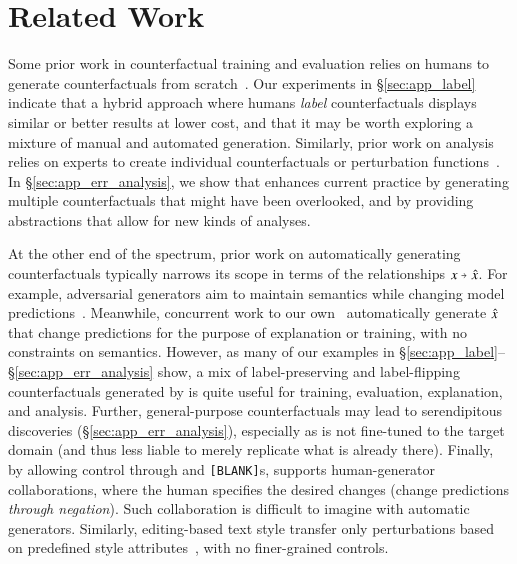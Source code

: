 \section{Related Work}
\label{sec:relate}

Some prior work in counterfactual training and evaluation relies on humans to generate counterfactuals from scratch~\cite{gardner2020contrast, teney2020learning, kaushik2019learning}. 
Our experiments in \S\ref{sec:app_label} indicate that a hybrid approach where humans \emph{label} \sysname{} counterfactuals displays similar or better results at lower cost, and that it may be worth exploring a mixture of manual and automated generation. 
Similarly, prior work on analysis relies on experts to create individual counterfactuals or perturbation functions~\cite{wu2019errudite, checklist:acl20}. 
In \S\ref{sec:app_err_analysis}, we show that \sysname{} enhances current practice by generating multiple counterfactuals that might have been overlooked, and by providing abstractions that allow for new kinds of analyses.

At the other end of the spectrum, prior work on automatically generating counterfactuals typically narrows its scope in terms of the relationships $x \veryshortarrow \xp$.
For example, adversarial generators aim to maintain semantics while changing model predictions~\cite{ribeiro2018semantically, iyyer2018adversarial, alzantot-etal-2018-generating}.
Meanwhile, concurrent work to our own~\cite{madaan2020generate, ross2020explaining} automatically generate $\hat{x}$ that change predictions for the purpose of explanation or training, with no constraints on semantics.
However, as many of our examples in \S\ref{sec:app_label}--\S\ref{sec:app_err_analysis} show, a mix of label-preserving and label-flipping counterfactuals generated by \sysname is quite useful for training, evaluation, explanation, and analysis. 
Further, general-purpose counterfactuals may lead to serendipitous discoveries (\S\ref{sec:app_err_analysis}), especially as \sysname is not fine-tuned to the target domain (and thus less liable to merely replicate what is already there).
Finally, by allowing control through \tagstrs and \texttt{[BLANK]}s, \sysname{} supports human-generator collaborations, where the human specifies the desired changes (\eg change predictions \emph{through negation}).
Such collaboration is difficult to imagine with automatic generators.
Similarly, editing-based text style transfer only perturbations based on predefined style attributes~\cite{madaan-etal-2020-politeness, malmi-etal-2020-unsupervised}, with no finer-grained controls.


